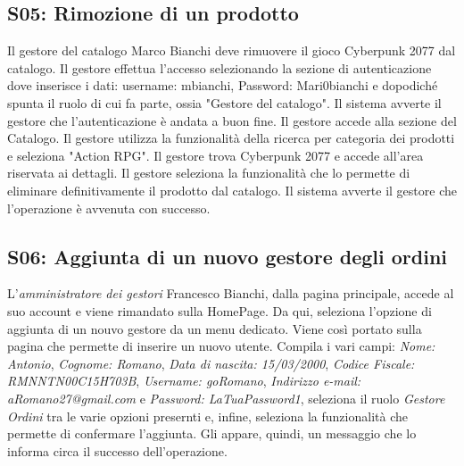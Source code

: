 \documentclass[12pt, a4paper, oneside]{book}
\begin{document}
    \subsection*{S05: Rimozione di un prodotto}
        Il gestore del catalogo Marco Bianchi deve rimuovere il gioco Cyberpunk 2077 dal catalogo.
        Il gestore effettua l'accesso selezionando la sezione di autenticazione dove inserisce i dati: username: mbianchi, Password: Mari0bianchi
        e dopodiché spunta il ruolo di cui fa parte, ossia "Gestore del catalogo".
        Il sistema avverte il gestore che l'autenticazione è andata a buon fine. Il gestore accede alla sezione del Catalogo.
        Il gestore utilizza la funzionalità della ricerca per categoria dei prodotti e seleziona "Action RPG". Il gestore
        trova Cyberpunk 2077 e accede all'area riservata ai dettagli. Il gestore seleziona la funzionalità che lo
        permette di eliminare definitivamente il prodotto dal catalogo. Il sistema avverte il gestore che l'operazione è avvenuta con successo.

    \subsection*{S06: Aggiunta di un nuovo gestore degli ordini}
        L'\textit{amministratore dei gestori} Francesco Bianchi, dalla pagina principale, accede al suo account e viene rimandato sulla HomePage.
        Da qui, seleziona l'opzione di aggiunta di un nouvo gestore da un menu dedicato. Viene così portato sulla pagina che permette di inserire un nuovo utente.
        Compila i vari campi: \textit{Nome: Antonio}, \textit{Cognome: Romano}, \textit{Data di nascita: 15/03/2000}, \textit{Codice Fiscale: RMNNTN00C15H703B},
        \textit{Username: goRomano}, \textit{Indirizzo e-mail: aRomano27@gmail.com} e \textit{Password: LaTuaPassword1}, seleziona il ruolo \textit{Gestore Ordini} tra le
        varie opzioni presernti e, infine, seleziona la funzionalità che permette di confermare l'aggiunta. Gli appare, quindi, un messaggio che lo informa circa il successo
        dell'operazione.
\end{document}
